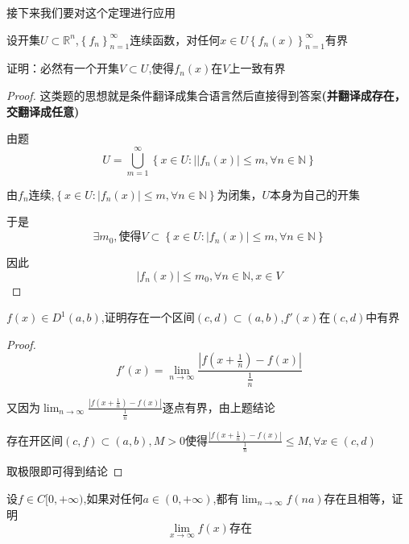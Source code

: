 \documentclass[lang=cn,10pt]{elegantbook}
\begin{document}
	接下来我们要对这个定理进行应用
	\begin{example}
		设开集$U\subset$$\mathbb{R}^{n}$,$\left\{ f_n \right\} _{n=1}^{\infty}$连续函数，对任何$x\in U$$\left\{ f_{n}(x) \right\} _{n=1}^{\infty}$有界
		
		证明：必然有一个开集$V\subset U$,使得$f_{n}(x)$在$V$上一致有界
	\end{example}
	\begin{proof}
		
		这类题的思想就是条件翻译成集合语言然后直接得到答案\textbf{(并翻译成存在，交翻译成任意)}
		
		由题
		\begin{equation*}
			U=\bigcup_{m=1}^{\infty}{\left\{ x\in U:||f_n\left( x \right) |\le m,\forall n\in \mathbb{N} \right\}}
		\end{equation*}
		
		由$f_{n}$连续,$\left\{ x\in U:|f_n\left( x \right) |\le m,\forall n\in \mathbb{N} \right\}$为闭集，$U$本身为自己的开集
		
		于是
		\begin{equation*}
			\exists m_0,\text{使得}V\subset \left\{ x\in U:|f_n\left( x \right) |\le m,\forall n\in \mathbb{N} \right\} 
		\end{equation*}
		
		因此
		\begin{equation*}
			|f_n\left( x \right) |\le m_0,\forall n\in \mathbb{N} ,x\in V
		\end{equation*}
	\end{proof}
	\begin{example}
		$f(x)\in D^{1}(a,b)$,证明存在一个区间$(c,d)\subset(a,b)$,$f'(x)$在$(c,d)$中有界
	\end{example}
	\begin{proof}
		\begin{equation*}
			f'\left( x \right) =\lim_{n\rightarrow \infty} \frac{|f\left( x+\frac{1}{n} \right) -f\left( x \right) |}{\frac{1}{n}}
		\end{equation*}
		
		又因为$\lim_{n\rightarrow \infty} \frac{|f\left( x+\frac{1}{n} \right) -f\left( x \right) |}{\frac{1}{n}}$逐点有界，由上题结论
		
		存在开区间$(c,f)\subset (a,b),M>0$使得$\frac{|f\left( x+\frac{1}{n} \right) -f\left( x \right) |}{\frac{1}{n}}\le M,\forall x\in (c,d)$
		
		取极限即可得到结论
	\end{proof}
	\begin{example}
		设$f$$\in C[0,+\infty)$,如果对任何$a\in (0,+\infty)$,都有$\lim_{n\rightarrow \infty} f\left( na \right) $存在且相等，证明
		\begin{equation*}
			\lim_{x\rightarrow \infty} f\left( x \right)\text{存在} 
		\end{equation*}
	\end{example}
\end{document}
